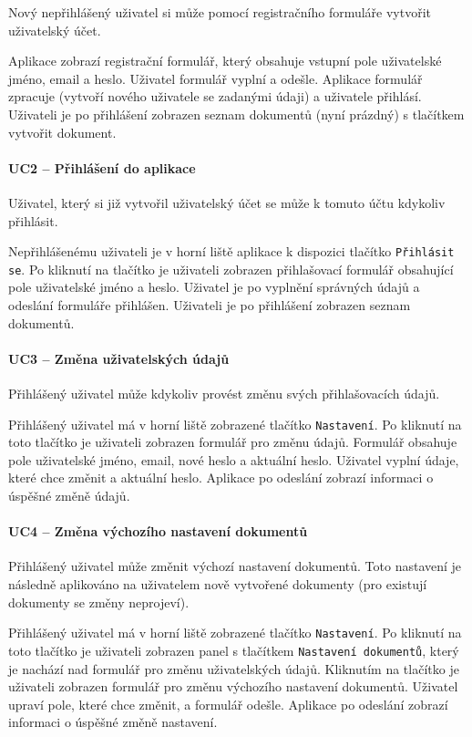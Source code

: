 Nový nepřihlášený uživatel si může pomocí registračního formuláře vytvořit uživatelský účet.

Aplikace zobrazí registrační formulář, který obsahuje vstupní pole uživatelské jméno, email a heslo.
Uživatel formulář vyplní a odešle.
Aplikace formulář zpracuje (vytvoří nového uživatele se zadanými údaji) a uživatele přihlásí.
Uživateli je po přihlášení zobrazen seznam dokumentů (nyní prázdný) s tlačítkem vytvořit dokument.

\paragraph{UC2 -- Přihlášení do aplikace}

Uživatel, který si již vytvořil uživatelský účet se může k tomuto účtu kdykoliv přihlásit.

Nepřihlášenému uživateli je v horní liště aplikace k dispozici tlačítko \texttt{Přihlásit se}.
Po kliknutí na tlačítko je uživateli zobrazen přihlašovací formulář obsahující pole uživatelské jméno a heslo.
Uživatel je po vyplnění správných údajů a odeslání formuláře přihlášen.
Uživateli je po přihlášení zobrazen seznam dokumentů.

\paragraph{UC3 -- Změna uživatelských údajů}

Přihlášený uživatel může kdykoliv provést změnu svých přihlašovacích údajů.

Přihlášený uživatel má v horní liště zobrazené tlačítko \texttt{Nastavení}.
Po kliknutí na toto tlačítko je uživateli zobrazen formulář pro změnu údajů.
Formulář obsahuje pole uživatelské jméno, email, nové heslo a aktuální heslo.
Uživatel vyplní údaje, které chce změnit a aktuální heslo.
Aplikace po odeslání zobrazí informaci o úspěšné změně údajů.

\paragraph{UC4 -- Změna výchozího nastavení dokumentů}

Přihlášený uživatel může změnit výchozí nastavení dokumentů.
Toto nastavení je následně aplikováno na uživatelem nově vytvořené dokumenty (pro existují dokumenty se změny neprojeví).

Přihlášený uživatel má v horní liště zobrazené tlačítko \texttt{Nastavení}.
Po kliknutí na toto tlačítko je uživateli zobrazen panel s tlačítkem \texttt{Nastavení dokumentů}, který je nachází nad formulář pro změnu uživatelských údajů.
Kliknutím na tlačítko je uživateli zobrazen formulář pro změnu výchozího nastavení dokumentů.
Uživatel upraví pole, které chce změnit, a formulář odešle.
Aplikace po odeslání zobrazí informaci o úspěšné změně nastavení.

